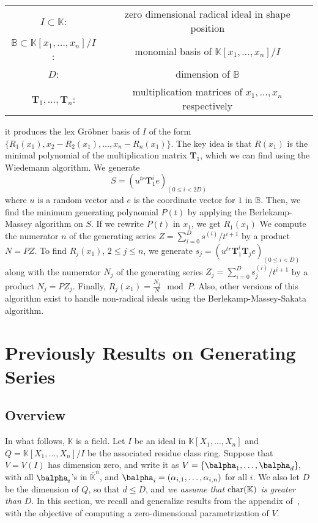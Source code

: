 \documentclass[12pt]{article}
\def\K {\ensuremath{\mathbb{K}}}
\def\Kbar {{\ensuremath{\overline{\mathbb{K}}}}}
\def\D {\ensuremath{D}}
\def\K{\mathbb{K}}
\def\mT{\mathbf{T}}
\begin{document}
\begin{center}
\begin{tabular}{c c}
	$I \subset \mathbb{K}$:& zero dimensional radical ideal
	in shape position\\
	$\mathbb{B} \subset \mathbb{K}[x_1,\dots,x_n]/I$:&
	monomial basis of $\mathbb{K}[x_1,\dots,x_n]/I$\\
	$D$: & dimension of $\mathbb{B}$\\
	$\mT_1,\dots,\mT_n$:& multiplication matrices of
	$x_1,\dots,x_n$ respectively	
\end{tabular}
\end{center}
it produces the lex Gr\"obner basis of $I$ of the form
$\{ R_1(x_1), x_2-R_2(x_1),\dots, x_n - R_n(x_1)  \}$.
The key idea is that $R(x_1)$ is the minimal polynomial
of the multiplication matrix $\mT_1$, which we can
find using the Wiedemann algorithm. We generate
$$ S = (u^{tr} \mT^i_1 e)_{(0 \le i < 2D)}$$
where $u$ is a random vector and $e$ is the coordinate
vector for $1$ in $\mathbb{B}$. Then, we find the minimum
generating polynomial $P(t)$ by
applying the Berlekamp-Massey algorithm on $S$.
If we rewrite $P(t)$ in $x_1$, we get $R_1(x_1)$
We compute the numerator $n$ of the generating series
$Z = \sum_{i=0}^{D} s^{(i)}/t^{i+1}$ by a product
$N = P Z$. To find $R_j(x_1)$, $2 \le j \le n$, we
generate $s_j = (u^{tr} \mT_1^i \mT_j e)_{(0 \le i < D)}$
along with the numerator $N_j$ of the generating series
$Z_j = \sum_{i=0}^{D} s_j^{(i)} / t^{i+1}$ by a product
$N_j = P Z_j$. Finally, $R_j(x_1) = \frac{N_j}{N} \mod P$.
Also, other versions of this algorithm exist to handle
non-radical ideals using the Berlekamp-Massey-Sakata algorithm.

\newpage
\section{Previously Results on Generating Series}

\subsection{Overview}
In what follows, $\K$ is a field.  Let $I$ be an ideal in
$\K[X_1,\dots,X_n]$ and $Q=\K[X_1,\dots,X_n]/I$ be the associated
residue class ring. Suppose that $V=V(I)$ has dimension zero, and
write it as $V=\{\balpha_1,\dots,\balpha_d\},$ with all $\balpha_i$'s
in $\Kbar^n$, and $\balpha_i=(\alpha_{i,1},\dots,\alpha_{i,n})$ for
all $i$.  We also let $\D$ be the dimension of $Q$, so that $d \le
\D$, and {\em we assume that ${\rm char}(\K)$ is greater than $D$}. In
this section, we recall and generalize results from the appendix
of~\cite{BoSaSc03}, with the objective of computing a zero-dimensional
parametrization of $V$.
\end{document}
